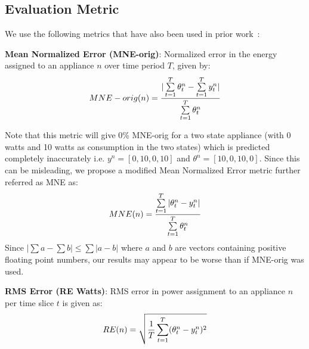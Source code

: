 \documentclass[conference]{IEEEtran}
\newcommand{\figref}[1]{Figure~\ref{#1}}
\begin{document}
\subsection{Evaluation Metric}
\vspace{-1mm}
\label{sec:metrics}
\noindent We use the following metrics that have also been used in prior work~\cite{parson2012_aaai,redd}:

\noindent\textbf{Mean Normalized Error (MNE-orig)}: Normalized error in the energy assigned to an appliance $n$ over time period $T$, given by:
\vspace{-5mm}
\begin{equation}
MNE-orig(n)=\frac{|\sum\limits_{t=1}^{T}\theta_t^n-\sum\limits_{t=1}^{T}y_t^n|}{\sum\limits_{t=1}^{T}\theta_t^n} 
\vspace{-2mm}
\end{equation} 

\noindent Note that this metric will give 0\% MNE-orig for a two state appliance (with 0 watts and 10 watts as consumption in the two states) which is predicted completely inaccurately i.e. $y^n=[0,10,0,10]$ and $\theta^n=[10,0,10,0]$. Since this can be misleading, we propose a modified Mean Normalized Error metric further referred as MNE as:
\vspace{-2mm}
\begin{equation}
MNE(n)=\frac{\sum\limits_{t=1}^{T}|\theta_t^n-y_t^n|}{\sum\limits_{t=1}^{T}\theta_t^n} 
\vspace{-2mm}
\end{equation} 
\noindent Since $|\sum a-\sum b| \le \sum|a-b|$ where $a$ and $b$ are vectors containing positive floating point numbers, our results may appear to be worse than if MNE-orig was used. 

\noindent\textbf{RMS Error (RE Watts)}: RMS error in power assignment to an appliance $n$ per time slice $t$ is given as:
\vspace{-2mm}
\begin{equation}
RE(n)=\sqrt{\frac{1}{T}\sum\limits_{t=1}^{T}(\theta_t^n-y_t^n)^2}
\vspace{-2mm}
\end{equation}
\end{document}
